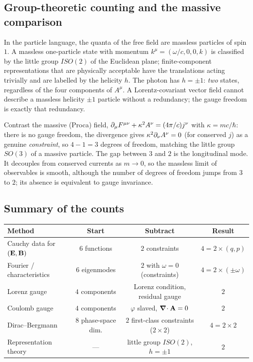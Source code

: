 \subsection{Group-theoretic counting and the massive comparison}

In the particle language, the quanta of the free field are massless
particles of spin $1$.  A massless one-particle state with momentum
$k^\mu=(\omega/c,0,0,k)$ is classified by the little group $ISO(2)$ of
the Euclidean plane; finite-component representations that are
physically acceptable have the translations acting trivially and are
labelled by the helicity $h$.  The photon has $h=\pm1$: \emph{two}
states, regardless of the four components of $A^\mu$.  A
Lorentz-covariant vector field cannot describe a massless helicity
$\pm1$ particle without a redundancy; the gauge freedom is exactly that
redundancy.

Contrast the massive (Proca) field, $\partial_\mu F^{\mu\nu}+\kappa^2A^\nu=(4\pi/c)j^\nu$ with
$\kappa=mc/\hbar$: there is no gauge freedom, the divergence gives
$\kappa^2\partial_\nu A^\nu=0$ (for conserved $j$) as a genuine \emph{constraint}, so
$4-1=3$ degrees of freedom, matching the little group $SO(3)$ of a massive
particle.  The gap between $3$ and $2$ is the longitudinal mode.  It decouples
from conserved currents as $m\to0$, so the massless limit of
observables is smooth, although the number of degrees of freedom jumps
from $3$ to $2$; its absence is equivalent to gauge invariance.

\subsection{Summary of the counts}

\begin{center}
\begin{tabular}{@{}lccc@{}}
\toprule
Method & Start & Subtract & Result\\
\midrule
Cauchy data for $(\mathbf{E},\mathbf{B})$ & $6$ functions & $2$ constraints & $4=2\times(q,p)$\\
Fourier / characteristics & $6$ eigenmodes & $2$ with $\omega=0$ (constraints) & $4=2\times(\pm\omega)$\\
Lorenz gauge & $4$ components & Lorenz condition, residual gauge & $2$\\
Coulomb gauge & $4$ components & $\varphi$ slaved, $\boldsymbol{\nabla}\!\cdot\mathbf{A}=0$ & $2$\\
Dirac--Bergmann & $8$ phase-space dim. & $2$ first-class constraints ($2\times2$) & $4=2\times 2$\\
Representation theory & --- & little group $ISO(2)$, $h=\pm1$ & $2$\\
\bottomrule
\end{tabular}
\end{center}

